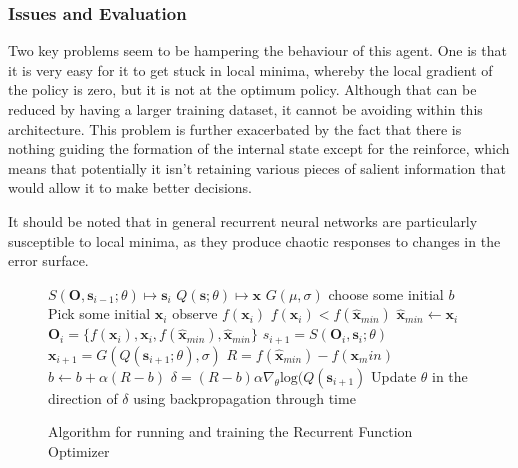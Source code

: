 \subsubsection{Issues and Evaluation} %
Two key problems seem to be hampering the behaviour of this agent. One is that it is very easy for it to get stuck in local minima, whereby the local gradient of the policy is zero, but it is not at the optimum policy. Although that can be reduced by having a larger training dataset, it cannot be avoiding within this architecture. This problem is further exacerbated by the fact that there is nothing guiding the formation of the internal state except for the reinforce, which means that potentially it isn't retaining various pieces of salient information that would allow it to make better decisions.

It should be noted that in general recurrent neural networks are particularly susceptible to local minima, as they produce chaotic responses to changes in the error surface. \cite{rnns} %


\begin{figure}
\centering
\begin{minipage}{.8\textwidth}
\begin{algorithmic}
\State $S(\boldsymbol{O}, \boldsymbol{s}_{i-1}; \theta) \mapsto \boldsymbol{s}_i$
\State $Q(\boldsymbol{s} ;\theta) \mapsto \boldsymbol{x} $
\State $G(\mu,\sigma)$  
\State choose some initial $b$ 
 \Repeat
 	\State Pick some initial $\boldsymbol{x}_i$
 	\Repeat
 		\State observe $f(\boldsymbol{x}_i)$
 		\If $f(\boldsymbol{x}_i) < f(\hat{\boldsymbol{x}}_{min})$
 			\State$ \hat{\boldsymbol{x}}_{min} \gets \boldsymbol{x}_i$
 		\EndIf
 		\State $\boldsymbol{O}_i = \{f(\boldsymbol{x}_i),\boldsymbol{x}_i, f(\hat{\boldsymbol{x}}_{min}), \hat{\boldsymbol{x}}_{min}\} $
 		\State $s_{i+1} = S(\boldsymbol{O}_i, \boldsymbol{s}_{i}; \theta)$
 		\State $\boldsymbol{x}_{i+1} = G(Q(\boldsymbol{s}_{i+1};\theta),\sigma)$ 
	\State $R = f(\hat{\boldsymbol{x}}_{min}) - f(\boldsymbol{x}_min)$
	\State $b \gets b  + \alpha (R - b)$ 
	\State $\delta = (R - b) \alpha \nabla_\theta \text{log}(Q(\boldsymbol{s}_{i+1})$
	\State Update $\theta$ in the direction of $\delta$ using backpropagation through time
 \end{algorithmic}
 \end{minipage}
 \caption{Algorithm for running and training the Recurrent Function Optimizer}
 \label{alg:rfo}
\end{figure}

